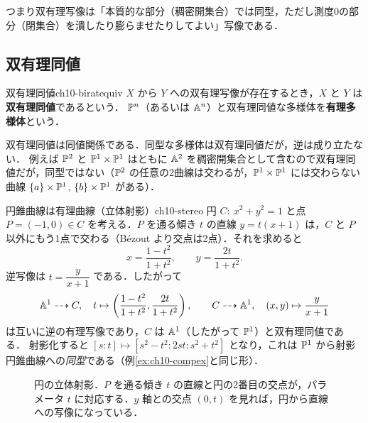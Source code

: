 つまり双有理写像は「本質的な部分（稠密開集合）では同型，ただし測度0の部分（閉集合）を潰したり膨らませたりしてよい」写像である．

\subsection{双有理同値}

\begin{mydef}{双有理同値}{ch10-biratequiv}
$X$ から $Y$ への双有理写像が存在するとき，$X$ と $Y$ は\textbf{双有理同値}であるという．
$\mathbb{P}^n$（あるいは $\mathbb{A}^n$）と双有理同値な多様体を\textbf{有理多様体}という．
\end{mydef}

双有理同値は同値関係である．同型な多様体は双有理同値だが，逆は成り立たない．
例えば $\mathbb{P}^2$ と $\mathbb{P}^1\times\mathbb{P}^1$ はともに $\mathbb{A}^2$ を稠密開集合として含むので双有理同値だが，同型ではない（$\mathbb{P}^2$ の任意の2曲線は交わるが，$\mathbb{P}^1\times\mathbb{P}^1$ には交わらない曲線 $\{a\}\times\mathbb{P}^1$, $\{b\}\times\mathbb{P}^1$ がある）．

\begin{myex}{円錐曲線は有理曲線（立体射影）}{ch10-stereo}
円 $C:\ x^2+y^2=1$ と点 $P=(-1,0)\in C$ を考える．$P$ を通る傾き $t$ の直線 $y=t(x+1)$ は，$C$ と $P$ 以外にもう1点で交わる（B\'ezout より交点は2点）．それを求めると
\[
  x=\frac{1-t^2}{1+t^2},\qquad y=\frac{2t}{1+t^2}.
\]
逆写像は $t=\dfrac{y}{x+1}$ である．したがって
\[
  \mathbb{A}^1\dashrightarrow C,\quad t\mapsto\left(\frac{1-t^2}{1+t^2},\frac{2t}{1+t^2}\right),\qquad
  C\dashrightarrow\mathbb{A}^1,\quad(x,y)\mapsto\frac{y}{x+1}
\]
は互いに逆の有理写像であり，$C$ は $\mathbb{A}^1$（したがって $\mathbb{P}^1$）と双有理同値である．
射影化すると $[s:t]\mapsto[s^2-t^2:2st:s^2+t^2]$ となり，これは $\mathbb{P}^1$ から射影円錐曲線への\emph{同型}である（例\ref{ex:ch10-compex}と同じ形）．
\end{myex}

\begin{figure}[htbp]
\centering
{}
\caption{円の立体射影．$P$ を通る傾き $t$ の直線と円の2番目の交点が，パラメータ $t$ に対応する．$y$ 軸との交点 $(0,t)$ を見れば，円から直線への写像になっている．}
\label{fig:ch10-stereo}
\end{figure}

